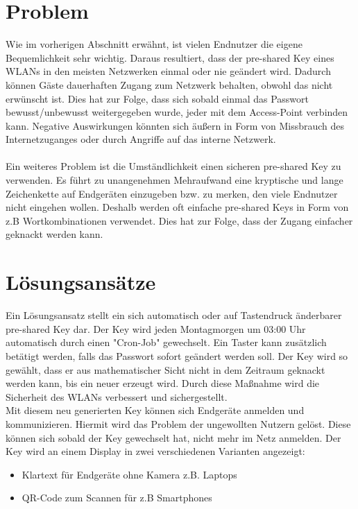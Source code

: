 \documentclass[a4paper,11pt,singlespacing]{article}
\begin{document}
	
	\section{Problem}
	Wie im vorherigen Abschnitt erwähnt, ist vielen Endnutzer die eigene Bequemlichkeit sehr wichtig. Daraus resultiert, dass der pre-shared Key eines WLANs in den meisten Netzwerken einmal oder nie geändert wird. Dadurch können Gäste dauerhaften Zugang zum Netzwerk behalten, obwohl das nicht erwünscht ist.  
	Dies hat zur Folge, dass sich sobald einmal das Passwort  bewusst/unbewusst weitergegeben wurde, jeder mit dem Access-Point verbinden kann. Negative Auswirkungen könnten sich äußern in Form von Missbrauch des Internetzuganges oder durch Angriffe auf das interne Netzwerk. \\ \\ 
	Ein weiteres Problem ist die Umständlichkeit einen sicheren pre-shared Key zu verwenden. Es führt zu unangenehmen Mehraufwand eine kryptische und lange Zeichenkette auf Endgeräten einzugeben bzw. zu merken, den viele Endnutzer nicht eingehen wollen. Deshalb werden oft einfache pre-shared Keys in Form von z.B Wortkombinationen verwendet. Dies hat zur Folge, dass der Zugang einfacher geknackt werden kann.
	
	\section{Lösungsansätze}
	Ein Lösungsansatz stellt ein sich automatisch oder auf Tastendruck änderbarer pre-shared Key dar. Der Key wird jeden Montagmorgen um 03:00 Uhr automatisch durch einen "Cron-Job" gewechselt. Ein Taster kann zusätzlich betätigt werden, falls das Passwort sofort geändert werden soll.
	Der Key wird so gewählt, dass er aus mathematischer Sicht nicht in dem Zeitraum geknackt werden kann, bis ein neuer erzeugt wird. Durch diese Maßnahme wird die Sicherheit des WLANs verbessert und sichergestellt. \\
	Mit diesem neu generierten Key können sich Endgeräte anmelden und kommunizieren. Hiermit wird das Problem der ungewollten Nutzern gelöst. Diese können sich sobald der Key gewechselt hat, nicht mehr im Netz anmelden. Der Key wird an einem Display in zwei verschiedenen Varianten angezeigt:
	\begin{itemize}
		\item Klartext für Endgeräte ohne Kamera z.B. Laptops
		\item QR-Code zum Scannen für z.B Smartphones
	\end{itemize}
\end{document}
